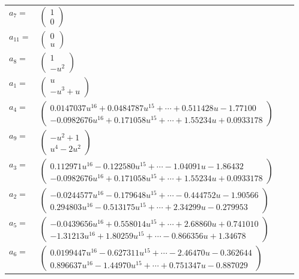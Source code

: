 \documentclass[1p]{elsarticle_modified}
\theoremstyle{definition}
\begin{document}
\begin{tabular}{m{7pt} m{180pt} m{7pt} m{180pt} }
\flushright $a_{7}=$&$\begin{pmatrix}1\\0\end{pmatrix}$ \\
\flushright $a_{11}=$&$\begin{pmatrix}0\\u\end{pmatrix}$ \\
\flushright $a_{8}=$&$\begin{pmatrix}1\\- u^2\end{pmatrix}$ \\
\flushright $a_{1}=$&$\begin{pmatrix}u\\- u^3+u\end{pmatrix}$ \\
\flushright $a_{4}=$&$\begin{pmatrix}0.0147037 u^{16}+0.0484787 u^{15}+\cdots+0.511428 u-1.77100\\-0.0982676 u^{16}+0.171058 u^{15}+\cdots+1.55234 u+0.0933178\end{pmatrix}$ \\
\flushright $a_{9}=$&$\begin{pmatrix}- u^2+1\\u^4-2 u^2\end{pmatrix}$ \\
\flushright $a_{3}=$&$\begin{pmatrix}0.112971 u^{16}-0.122580 u^{15}+\cdots-1.04091 u-1.86432\\-0.0982676 u^{16}+0.171058 u^{15}+\cdots+1.55234 u+0.0933178\end{pmatrix}$ \\
\flushright $a_{2}=$&$\begin{pmatrix}-0.0244577 u^{16}-0.179648 u^{15}+\cdots-0.444752 u-1.90566\\0.294803 u^{16}-0.513175 u^{15}+\cdots+2.34299 u-0.279953\end{pmatrix}$ \\
\flushright $a_{5}=$&$\begin{pmatrix}-0.0439656 u^{16}+0.558014 u^{15}+\cdots+2.68860 u+0.741010\\-1.31213 u^{16}+1.80259 u^{15}+\cdots-0.866356 u+1.34678\end{pmatrix}$ \\
\flushright $a_{6}=$&$\begin{pmatrix}0.0199447 u^{16}-0.627311 u^{15}+\cdots-2.46470 u-0.362644\\0.896637 u^{16}-1.44970 u^{15}+\cdots+0.751347 u-0.887029\end{pmatrix}$ \\

\end{tabular}
\end{document}
